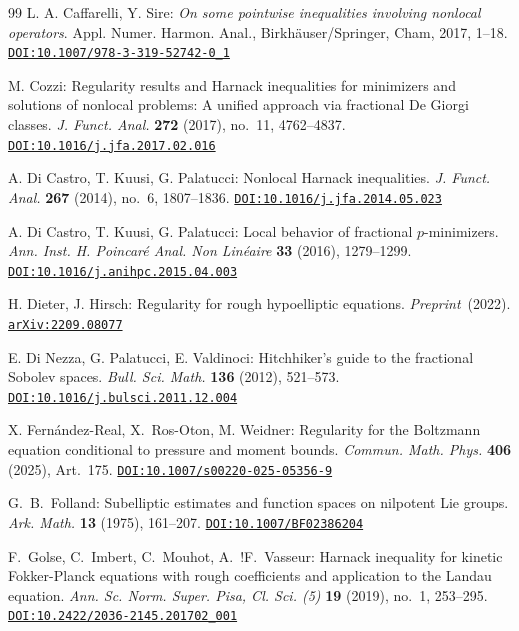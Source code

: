 \documentclass[leqno,10pt]{amsart}
\theoremstyle{plain}
\theoremstyle{remark}
\numberwithin{equation}{section}
\def\vs{\vspace{1mm}}
\begin{document}
{\begin{thebibliography}{99}
 \vs {}
{L. A. Caffarelli, Y. Sire}:
{\it On some pointwise inequalities involving nonlocal operators}.
Appl. Numer. Harmon. Anal., Birkh\"auser/Springer, Cham, 2017, 1--18.
\href{http://dx.doi.org/10.1007/978-3-319-52742-0_1}{\tt DOI:10.1007/978-3-319-52742-0\_1} 
 
\vs {}
{M. Cozzi}:
Regularity results and Harnack inequalities for minimizers and solutions of nonlocal problems: A unified approach via fractional De Giorgi classes.
{\it J. Funct. Anal.} {\bf 272} (2017), no.~11, 4762--4837.
\href{http://dx.doi.org/10.1016/j.jfa.2017.02.016}{\tt DOI:10.1016/j.jfa.2017.02.016} 
 
 \vs {}
{A. Di Castro, T. Kuusi, G. Palatucci}:
Nonlocal Harnack inequalities.
{\it J. Funct. Anal.} {\bf 267} (2014), no.~6, 1807--1836.
\href{http://dx.doi.org/10.1016/j.jfa.2014.05.023}{\tt DOI:10.1016/j.jfa.2014.05.023} 

\vs {}
{A. Di Castro, T. Kuusi, G. Palatucci}:
Local behavior of fractional $p$-minimizers.
{\it Ann. Inst. H. Poincar\'e Anal. Non Lin\'eaire} {\bf 33} (2016), 1279--1299.
\href{http://dx.doi.org/10.1016/j.anihpc.2015.04.003}{\tt DOI:10.1016/j.anihpc.2015.04.003} 

\vs {}
{H. Dieter, J. Hirsch}:
Regularity for rough hypoelliptic equations.
{\it Preprint}~(2022).
\href{https://arxiv.org/abs/2209.08077}{\tt arXiv:2209.08077} 

\vs {}
{E. Di Nezza, G. Palatucci, E. Valdinoci}:
Hitchhiker's guide to the fractional Sobolev spaces.
{\it Bull. Sci. Math.} {\bf 136} (2012), 521--573.
\href{http://dx.doi.org/10.1016/j.bulsci.2011.12.004}{\tt DOI:10.1016/j.bulsci.2011.12.004} 


\vs {}
{X. Fern\'andez-Real, X.~Ros-Oton, M. Weidner}:
Regularity for the Boltzmann equation conditional to pressure and moment bounds.
{\it Commun. Math. Phys.} {\bf 406} (2025), Art.~175.
\href{http://dx.doi.org/10.1007/s00220-025-05356-9}{\tt DOI:10.1007/s00220-025-05356-9}

\vs {}
{G.~\!B.~Folland}:
Subelliptic estimates and function spaces on nilpotent Lie groups.
{\it Ark. Math.} {\bf 13} (1975), 161--207.
\href{http://dx.doi.org/10.1007/BF02386204}{\tt  DOI:10.1007/BF02386204}



\vs {}
{F.~Golse, C.~Imbert, C.~Mouhot, A.~!F.~Vasseur}:
Harnack inequality for kinetic Fokker-Planck equations with rough coefficients and application to the Landau equation.
{\it Ann. Sc. Norm. Super. Pisa, Cl. Sci. (5)} {\bf 19} (2019), no.~1, 253--295.
\href{http://dx.doi.org/10.2422/2036-2145.201702_001}{\tt DOI:10.2422/2036-2145.201702\_001}


\end{thebibliography}}
\end{document}
